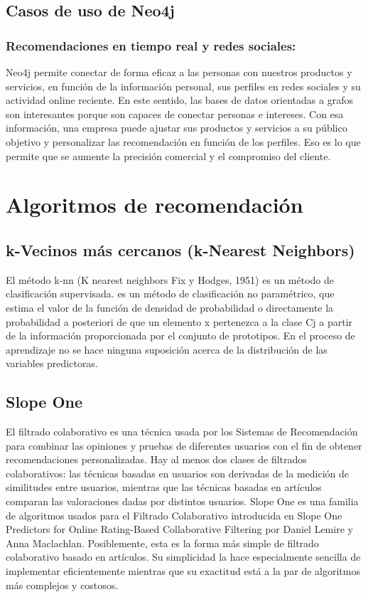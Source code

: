 \subsection{Casos de uso de Neo4j}
\subsubsection{Recomendaciones en tiempo real y redes sociales:}
	Neo4j permite conectar de forma eficaz a las personas con nuestros productos y servicios, en función de la información personal, sus perfiles en redes sociales y su actividad online reciente. En este sentido, las bases de datos orientadas a grafos son interesantes porque son capaces de conectar personas e intereses.
	Con esa información, una empresa puede ajustar sus productos y servicios a su público objetivo y personalizar las recomendación en función de los perfiles. Eso es lo que permite que se aumente la precisión comercial y el compromiso del cliente.

\section{Algoritmos de recomendación}
\subsection{k-Vecinos más cercanos (k-Nearest Neighbors)}
	El método k-nn (K nearest neighbors Fix y Hodges, 1951) es un método de clasificación supervisada. es un método de clasificación no paramétrico, que estima el valor de la función de densidad de probabilidad o directamente la probabilidad a posteriori de que un elemento x pertenezca a la clase Cj a partir de la información proporcionada por el conjunto de prototipos. En el proceso de aprendizaje no se hace ninguna suposición acerca de la distribución de las variables predictoras.

\subsection{Slope One}
	El filtrado colaborativo es una técnica usada por los Sistemas de Recomendación para combinar las opiniones y pruebas de diferentes usuarios con el fin de obtener recomendaciones personalizadas. Hay al menos dos clases de filtrados colaborativos: las técnicas basadas en usuarios son derivadas de la medición de similitudes entre usuarios, mientras que las técnicas basadas en artículos comparan las valoraciones dadas por distintos usuarios. Slope One es una familia de algoritmos usados para el Filtrado Colaborativo introducida en Slope One Predictors for Online Rating-Based Collaborative Filtering por Daniel Lemire y Anna Maclachlan. Posiblemente, esta es la forma más simple de filtrado colaborativo basado en artículos. Su simplicidad la hace especialmente sencilla de implementar eficientemente mientras que su exactitud está a la par de algoritmos más complejos y costosos.
